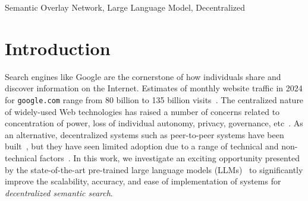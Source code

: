 \documentclass[10pt,journal]{IEEEtran}
\begin{document}
\begin{IEEEkeywords}
Semantic Overlay Network, Large Language Model, Decentralized
\end{IEEEkeywords}


\section{Introduction}
Search engines like Google are the cornerstone of how individuals share and discover information on the Internet.
Estimates of monthly website traffic in 2024 for \texttt{google.com} range from 80 billion to 135 billion visits~\cite{statista_google, semrush2024google}. %
The centralized nature of widely-used Web technologies has raised a number of concerns related to concentration of power, loss of individual autonomy, privacy, governance, etc~\cite{zuboff2023age, stucke2022breaking}.
As an alternative, decentralized systems such as peer-to-peer systems have been built~\cite{rodrigues2010peer}, but they have seen limited adoption due to a range of technical and non-technical factors~\cite{Baquero2023}.
In this work, we investigate an exciting opportunity presented by the state-of-the-art pre-trained large language models (LLMs)~\cite{min2023recent} to significantly improve the scalability, accuracy, and ease of implementation of systems for \emph{decentralized semantic search}. %
\end{document}

